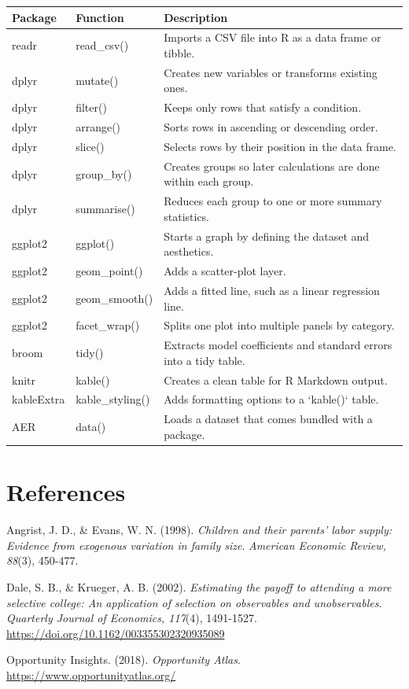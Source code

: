 \documentclass[
]{article}
\begin{document}
\begin{longtable}[t]{lll}
\toprule
Package & Function & Description\\
\midrule
readr & read\_csv() & Imports a CSV file into R as a data frame or tibble.\\
dplyr & mutate() & Creates new variables or transforms existing ones.\\
dplyr & filter() & Keeps only rows that satisfy a condition.\\
dplyr & arrange() & Sorts rows in ascending or descending order.\\
dplyr & slice() & Selects rows by their position in the data frame.\\
\addlinespace
dplyr & group\_by() & Creates groups so later calculations are done within each group.\\
dplyr & summarise() & Reduces each group to one or more summary statistics.\\
ggplot2 & ggplot() & Starts a graph by defining the dataset and aesthetics.\\
ggplot2 & geom\_point() & Adds a scatter-plot layer.\\
ggplot2 & geom\_smooth() & Adds a fitted line, such as a linear regression line.\\
\addlinespace
ggplot2 & facet\_wrap() & Splits one plot into multiple panels by category.\\
broom & tidy() & Extracts model coefficients and standard errors into a tidy table.\\
knitr & kable() & Creates a clean table for R Markdown output.\\
kableExtra & kable\_styling() & Adds formatting options to a `kable()` table.\\
AER & data() & Loads a dataset that comes bundled with a package.\\
\bottomrule
\end{longtable}

\section{References}\label{references}

Angrist, J. D., \& Evans, W. N. (1998). \emph{Children and their
parents' labor supply: Evidence from exogenous variation in family
size}. \emph{American Economic Review, 88}(3), 450-477.

Dale, S. B., \& Krueger, A. B. (2002). \emph{Estimating the payoff to
attending a more selective college: An application of selection on
observables and unobservables}. \emph{Quarterly Journal of Economics,
117}(4), 1491-1527. \url{https://doi.org/10.1162/003355302320935089}

Opportunity Insights. (2018). \emph{Opportunity Atlas}.
\url{https://www.opportunityatlas.org/}
\end{document}
